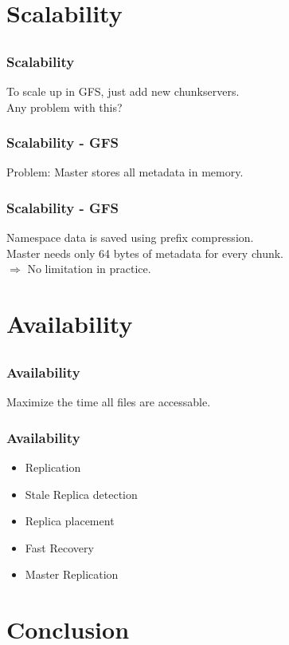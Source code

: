 \documentclass[notes=hide,yellow]{beamer}
\begin{document}
\section{Scalability}
\subsection*{}
\begin{frame}
	\frametitle{Scalability}
	To scale up in GFS, just add new chunkservers.\\
	Any problem with this?
\end{frame}


\begin{frame}
	\frametitle{ Scalability - GFS }
	Problem: Master stores all metadata in memory. 
\end{frame}

\begin{frame}
	\frametitle{ Scalability - GFS }
	Namespace data is saved using prefix compression. \\
	Master needs only 64 bytes of metadata for every chunk. \\
	$\Rightarrow$ No limitation in practice.
\end{frame}

\section{Availability}
\subsection*{}
\begin{frame}
	\frametitle{Availability}
	Maximize the time all files are accessable.

\end{frame}

\begin{frame}
	\frametitle{Availability}
	\begin{itemize}
		\item Replication
		\item Stale Replica detection 
		\item Replica placement 
		\item Fast Recovery
		\item Master Replication
	\end{itemize}
\end{frame}


\section{Conclusion}
\end{document}
